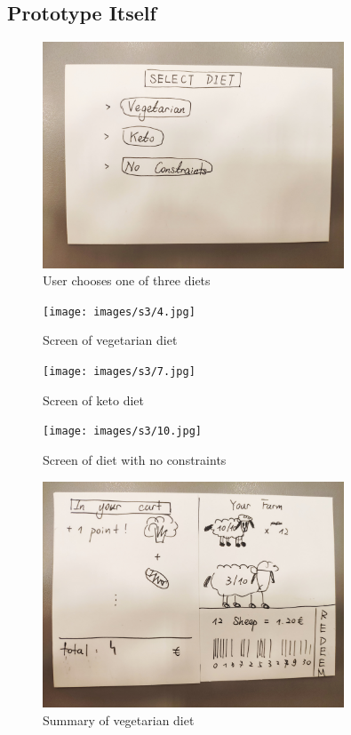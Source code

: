 \clearpage
\subsection{Prototype Itself}

\begin{figure}[H]
	\centering
	\includegraphics[trim={10em 10em 10em 10em},  clip, width=0.80\textwidth]{images/s3/1.jpg}
	\caption{ User chooses one of three diets }
	\label{s3:menu}
\end{figure}

\begin{figure}[H]
	\centering
	\texttt{[image: images/s3/4.jpg]}
	\caption{ Screen of vegetarian diet }
	\label{s3:vege}
\end{figure}

\begin{figure}[H]
	\centering
	\texttt{[image: images/s3/7.jpg]}
	\caption{ Screen of keto diet }
	\label{s3:keto}
\end{figure}

\begin{figure}[H]
	\centering
	\texttt{[image: images/s3/10.jpg]}
	\caption{ Screen of diet with no constraints }
	\label{s3:nocons}
\end{figure}

\begin{figure}[H]
	\centering
	\includegraphics[trim={10em 10em 10em 10em}, clip, width=0.8\textwidth]{images/s3/5.jpg}
	\caption{ Summary of vegetarian diet }
	\label{s3:sumvege}
\end{figure}

